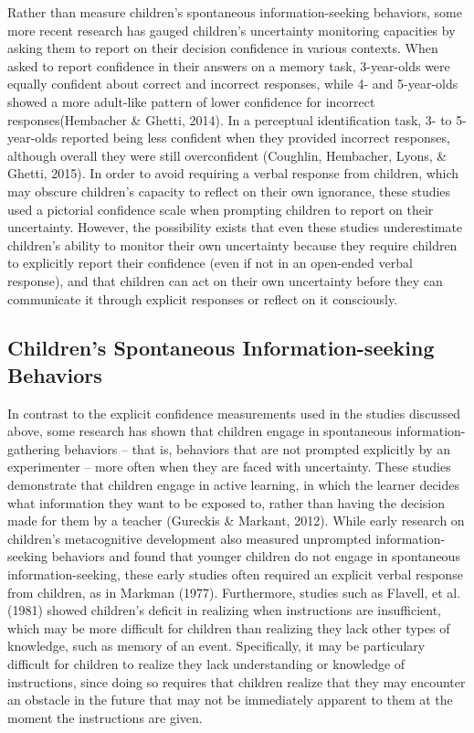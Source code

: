 \documentclass[floatsintext,man]{apa6}
\theoremstyle{definition}
\theoremstyle{definition}
\theoremstyle{definition}
\theoremstyle{remark}
\begin{document}
Rather than measure children's spontaneous information-seeking
behaviors, some more recent research has gauged children's uncertainty
monitoring capacities by asking them to report on their decision
confidence in various contexts. When asked to report confidence in their
answers on a memory task, 3-year-olds were equally confident about
correct and incorrect responses, while 4- and 5-year-olds showed a more
adult-like pattern of lower confidence for incorrect responses(Hembacher
\& Ghetti, 2014). In a perceptual identification task, 3- to 5-year-olds
reported being less confident when they provided incorrect responses,
although overall they were still overconfident (Coughlin, Hembacher,
Lyons, \& Ghetti, 2015). In order to avoid requiring a verbal response
from children, which may obscure children's capacity to reflect on their
own ignorance, these studies used a pictorial confidence scale when
prompting children to report on their uncertainty. However, the
possibility exists that even these studies underestimate children's
ability to monitor their own uncertainty because they require children
to explicitly report their confidence (even if not in an open-ended
verbal response), and that children can act on their own uncertainty
before they can communicate it through explicit responses or reflect on
it consciously.

\subsection{Children's Spontaneous Information-seeking
Behaviors}\label{childrens-spontaneous-information-seeking-behaviors}

In contrast to the explicit confidence measurements used in the studies
discussed above, some research has shown that children engage in
spontaneous information-gathering behaviors -- that is, behaviors that
are not prompted explicitly by an experimenter -- more often when they
are faced with uncertainty. These studies demonstrate that children
engage in active learning, in which the learner decides what information
they want to be exposed to, rather than having the decision made for
them by a teacher (Gureckis \& Markant, 2012). While early research on
children's metacognitive development also measured unprompted
information-seeking behaviors and found that younger children do not
engage in spontaneous information-seeking, these early studies often
required an explicit verbal response from children, as in Markman
(1977). Furthermore, studies such as Flavell, et al. (1981) showed
children's deficit in realizing when instructions are insufficient,
which may be more difficult for children than realizing they lack other
types of knowledge, such as memory of an event. Specifically, it may be
particulary difficult for children to realize they lack understanding or
knowledge of instructions, since doing so requires that children realize
that they may encounter an obstacle in the future that may not be
immediately apparent to them at the moment the instructions are given.
\end{document}
